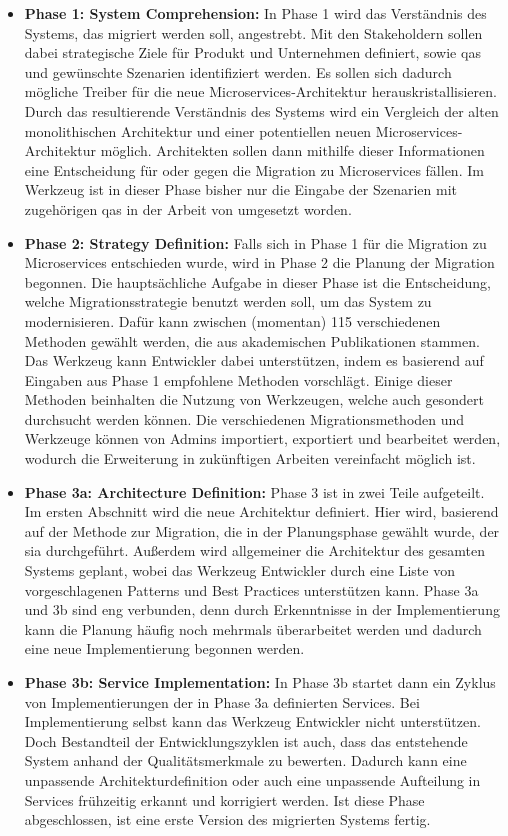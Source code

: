 \begin{itemize}
	\item \textbf{Phase 1: System Comprehension:}
	In Phase 1 wird das Verständnis des Systems, das migriert werden soll, angestrebt.
	Mit den Stakeholdern sollen dabei strategische Ziele für Produkt und Unternehmen definiert, sowie \glspl{qa} und gewünschte Szenarien identifiziert werden.
	Es sollen sich dadurch mögliche Treiber für die neue Microservices-Architektur herauskristallisieren.
	Durch das resultierende Verständnis des Systems wird ein Vergleich der alten monolithischen Architektur und einer potentiellen neuen Microservices-Architektur möglich.
	Architekten sollen dann mithilfe dieser Informationen eine Entscheidung für oder gegen die Migration zu Microservices fällen.
	Im Werkzeug ist in dieser Phase bisher nur die Eingabe der Szenarien mit zugehörigen \glspl{qa} in der Arbeit von  umgesetzt worden.
	\item \textbf{Phase 2: Strategy Definition:}
	Falls sich in Phase 1 für die Migration zu Microservices entschieden wurde, wird in Phase 2 die Planung der Migration begonnen.
	Die hauptsächliche Aufgabe in dieser Phase ist die Entscheidung, welche Migrationsstrategie benutzt werden soll, um das System zu modernisieren.
	Dafür kann zwischen (momentan) 115 verschiedenen Methoden gewählt werden, die aus akademischen Publikationen stammen.
	Das Werkzeug kann Entwickler dabei unterstützen, indem es basierend auf Eingaben aus Phase 1 empfohlene Methoden vorschlägt.
	Einige dieser Methoden beinhalten die Nutzung von Werkzeugen, welche auch gesondert durchsucht werden können.
	Die verschiedenen Migrationsmethoden und Werkzeuge können von Admins importiert, exportiert und bearbeitet werden, wodurch die Erweiterung in zukünftigen Arbeiten vereinfacht möglich ist.
	\item \textbf{Phase 3a: Architecture Definition:}
	Phase 3 ist in zwei Teile aufgeteilt.
	Im ersten Abschnitt wird die neue Architektur definiert.
	Hier wird, basierend auf der Methode zur Migration, die in der Planungsphase gewählt wurde, der \gls{sia} durchgeführt.
	Außerdem wird allgemeiner die Architektur des gesamten Systems geplant, wobei das Werkzeug Entwickler durch eine Liste von vorgeschlagenen Patterns und Best Practices unterstützen kann.
	 Phase 3a und 3b sind eng verbunden, denn durch Erkenntnisse in der Implementierung kann die Planung häufig noch mehrmals überarbeitet werden und dadurch eine neue Implementierung begonnen werden.
	\item \textbf{Phase 3b: Service Implementation:} In Phase 3b startet dann ein Zyklus von Im\-ple\-men\-tie\-rung\-en der in Phase 3a definierten Services.
	Bei Implementierung selbst kann das Werkzeug Entwickler nicht unterstützen.
	Doch Bestandteil der Entwicklungszyklen ist auch, dass das entstehende System anhand der Qualitätsmerkmale zu bewerten.
	Dadurch kann eine unpassende Architekturdefinition oder auch eine unpassende Aufteilung in Services frühzeitig erkannt und korrigiert werden.
	Ist diese Phase abgeschlossen, ist eine erste Version des migrierten Systems fertig.
\end{itemize}

